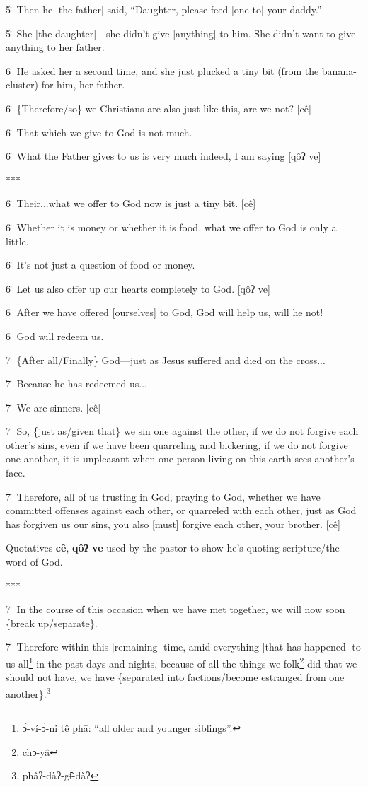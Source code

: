 5\. Then he [the father] said, ``Daughter, please feed [one to] your daddy.''

5\. She [the daughter]---she didn't give [anything] to him. She didn't want to
give anything to her father.

6\. He asked her a second time, and she just plucked a tiny bit (from the banana-cluster)
for him, her father.

6\. \{Therefore/so\} we Christians are also just like this, are we not? [cê]

6\. That which we give to God is not much.

6\. What the Father gives to us is very much indeed, I am saying [qôʔ ve]

***

6\. Their...what we offer to God now is just a tiny bit. [cê]

6\. Whether it is money or whether it is food, what we offer to God is only a little.

6\. It's not just a question of food or money.

6\. Let us also offer up our hearts completely to God. [qôʔ ve]

6\. After we have offered [ourselves] to God, God will help us, will he not!

6\. God will redeem us.

7\. \{After all/Finally\} God---just as Jesus suffered and died on the cross...

7\. Because he has redeemed us...

7\. We are sinners. [cê]

7\. So, \{just as/given that\} we sin one against the other, if we do not forgive
each other's sins, even if we have been quarreling and bickering, if we do not
forgive one another, it is unpleasant when one person living on this earth sees
another's face.

7\. Therefore, all of us trusting in God, praying to God, whether we have committed
offenses against each other, or quarreled with each other, just as God has forgiven
us our sins, you also [must] forgive each other, your brother. [cê]

Quotatives \textbf{cê}, \textbf{qôʔ ve }used by the pastor to show he's quoting
scripture/the word of God.

***

7\. In the course of this occasion when we have met together, we will now soon
\{break up/separate\}.

7\. Therefore within this [remaining] time, amid everything [that has happened]
to us all\footnote{ɔ̀-ví-ɔ̀-ni tê phā: ``all older and younger siblings''.} in the past days and nights, because of all the things we folk\footnote{chɔ-yâ}
did that we should not have, we have \{separated into factions/become estranged
from one another\}.\footnote{phâʔ-dàʔ-gɨ̂-dàʔ}

